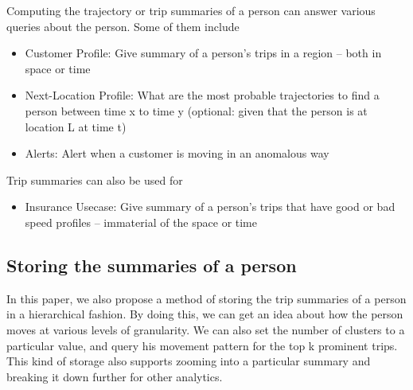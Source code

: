 Computing the trajectory or trip summaries of a person can answer various queries about the person. Some of them include 
	  \begin{itemize}
			\item Customer Profile: Give summary of a person's trips in a region -- both in space or time
			\item Next-Location Profile: What are the most probable trajectories to find a person between time x to time y (optional: given that the person is at location L at time t)
			\item Alerts: Alert when a customer is moving in an anomalous way
		\end{itemize}
Trip summaries can also be used for
		\begin{itemize}
			\item Insurance Usecase: Give summary of a person's trips that have good or bad speed profiles -- immaterial of the space or time
		\end{itemize}


\subsection{ Storing the summaries of a person}

\par In this paper, we also propose a method of storing the trip summaries of  a person in a hierarchical fashion. By doing this, we can get an idea about how the person moves at various levels of granularity. We can also set the number of clusters to a particular value, and query his movement pattern for the top k prominent trips. This kind of storage also supports zooming into a particular summary and breaking it down further for other analytics.
